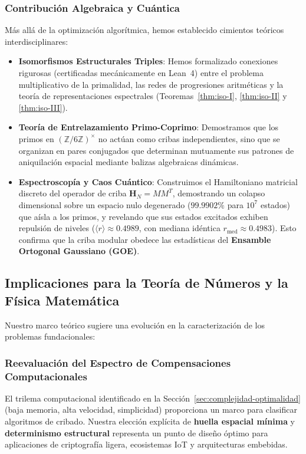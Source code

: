 \documentclass{article}
\numberwithin{equation}{section}
\theoremstyle{plain}
\theoremstyle{definition}
\begin{document}
\subsubsection{Contribución Algebraica y Cuántica}

Más allá de la optimización algorítmica, hemos establecido cimientos teóricos interdisciplinares:

\begin{itemize}
    \item \textbf{Isomorfismos Estructurales Triples}: Hemos formalizado conexiones rigurosas (certificadas mecánicamente en Lean~4) entre el problema multiplicativo de la primalidad, las redes de progresiones aritméticas y la teoría de representaciones espectrales (Teoremas~\ref{thm:iso-I}, \ref{thm:iso-II} y \ref{thm:iso-III}).
    \item \textbf{Teoría de Entrelazamiento Primo-Coprimo}: Demostramos que los primos en $(\mathbb{Z}/6\mathbb{Z})^\times$ no actúan como cribas independientes, sino que se organizan en pares conjugados que determinan mutuamente sus patrones de aniquilación espacial mediante balizas algebraicas dinámicas.
    \item \textbf{Espectroscopía y Caos Cuántico}: Construimos el Hamiltoniano matricial discreto del operador de criba $\mathbf{H}_N = M M^T$, demostrando un colapso dimensional sobre un espacio nulo degenerado ($99.9902\%$ para $10^7$ estados) que aísla a los primos, y revelando que sus estados excitados exhiben repulsión de niveles ($\langle r \rangle \approx 0.4989$, con mediana idéntica $r_{\text{med}} \approx 0.4983$). Esto confirma que la criba modular obedece las estadísticas del \textbf{Ensamble Ortogonal Gaussiano (GOE)}.
\end{itemize}

\subsection{Implicaciones para la Teoría de Números y la Física Matemática}

Nuestro marco teórico sugiere una evolución en la caracterización de los problemas fundacionales:

\subsubsection{Reevaluación del Espectro de Compensaciones Computacionales}

El trilema computacional identificado en la Sección~\ref{sec:complejidad-optimalidad} (baja memoria, alta velocidad, simplicidad) proporciona un marco para clasificar algoritmos de cribado. Nuestra elección explícita de \textbf{huella espacial mínima} y \textbf{determinismo estructural} representa un punto de diseño óptimo para aplicaciones de criptografía ligera, ecosistemas IoT y arquitecturas embebidas.
\end{document}
